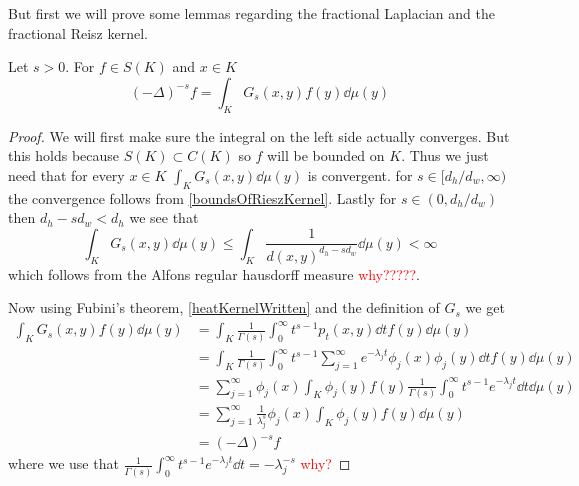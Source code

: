 But first we will prove some lemmas regarding the fractional Laplacian and the fractional Reisz kernel.
\begin{lemma}
	Let $s > 0$. For $f \in S(K)$ and $x \in K$
	\begin{equation}
		(-\Delta)^{-s}f = \int_{K}G_s(x,y)f(y) \dd \mu(y)
	\end{equation}
\end{lemma}
\begin{proof}
	We will first make sure the integral on the left side actually converges. But this holds because $S(K) \subset C(K)$ so $f$ will be bounded on $K$. Thus we just need that for every $x \in K$ $\int_{K}G_s(x,y) \dd \mu(y)$ is convergent. for $s \in [d_h/d_w, \infty)$ the convergence follows from \cref{boundsOfRieszKernel}. Lastly for $s \in (0, d_h/d_w)$ then $d_h-sd_w < d_h$ we see that
	\begin{equation}
		\int_{K}G_s(x,y)\dd \mu (y) \leq \int_{K}\frac{1}{d(x,y)^{d_h-sd_w}}  \dd \mu (y) < \infty
	\end{equation}
	which follows from the Alfons regular hausdorff measure \textcolor{red}{why?????}.
	
	Now using Fubini's theorem, \cref{heatKernelWritten} and the definition of $G_s$ we get
	\begin{align}
		\int_{K} G_s(x,y) f(y) \dd \mu (y) & = \int_{K} \frac{1}{\Gamma(s)}\int_{0}^{\infty} t^{s-1}p_t(x,y) \dd t f(y)\dd \mu (y) \\
		&= \int_{K} \frac{1}{\Gamma(s)}\int_{0}^{\infty} t^{s-1} \sum_{j = 1}^{\infty} e^{-\lambda_j t} \phi_j(x)\phi_j(y)  \dd t f(y)\dd \mu (y) \\
		&= \sum_{j = 1}^{\infty} \phi_j(x) \int_{K}\phi_{j}(y) f(y)  \frac{1}{\Gamma(s)} \int_{0}^{\infty} t^{s-1}e^{-\lambda_j t} \dd t \dd \mu(y) \\
		&= \sum_{j = 1}^{\infty} \frac{1}{\lambda_{j}^{s}} \phi_j(x) \int_{K}\phi_j(y)f(y) \dd \mu(y) \\
		&= (-\Delta)^{-s}f
 	\end{align}
 	where we use that $\frac{1}{\Gamma(s)} \int_{0}^{\infty} t^{s-1}e^{-\lambda_j t} \dd t  = -\lambda_j^{-s}$ \textcolor{red}{why?}
\end{proof}

